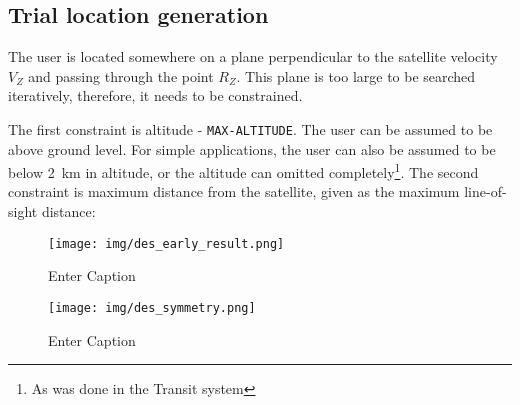\subsection{Trial location generation}
The user is located somewhere on a plane perpendicular to the satellite velocity $V_Z$ and passing through the point $R_Z$. This plane is too large to be searched iteratively, therefore, it needs to be constrained.

The first constraint is altitude - \texttt{MAX-ALTITUDE}. The user can be assumed to be above ground level. For simple applications, the user can also be assumed to be below \qty{2}{km} in altitude, or the altitude can omitted completely\footnote{As was done in the Transit system}. The second constraint is maximum distance from the satellite, given as the maximum line-of-sight distance:

\begin{figure}
    \centering
    \texttt{[image: img/des\_early\_result.png]}
    \caption{Enter Caption}
    \label{f_des_early_result}
\end{figure}

\begin{figure}
    \centering
    \texttt{[image: img/des\_symmetry.png]}
    \caption{Enter Caption}
    \label{f_des_symmetry}
\end{figure}
